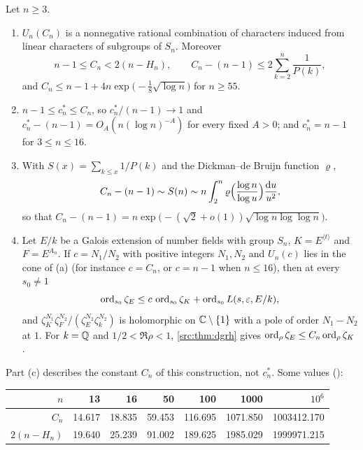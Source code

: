 \begin{theorem}\label{nab:thm:snasym}
Let $n\ge3$.
\begin{enumerate}[label=\textup{(\alph*)}]
\item $U_n(C_n)$ is a nonnegative rational combination of characters induced from linear
characters of subgroups of $S_n$. Moreover
\[
 n-1\le C_n<2(n-H_n),\qquad C_n-(n-1)\le2\sum_{k=2}^n\frac1{P(k)},
\]
and $C_n\le n-1+4n\exp\bigl(-\tfrac18\sqrt{\log n}\bigr)$ for $n\ge55$.
\item $n-1\le c_n^*\le C_n$, so $c_n^*/(n-1)\to1$ and $c_n^*-(n-1)=O_A(n(\log n)^{-A})$ for
every fixed $A>0$; and $c_n^*=n-1$ for $3\le n\le16$.
\item With $S(x)=\sum_{k\le x}1/P(k)$ and the Dickman--de Bruijn function $\varrho$,
\[
 C_n-(n-1)\sim S(n)\sim n\int_2^n\varrho\Bigl(\frac{\log n}{\log u}\Bigr)\frac{\mathrm{d} u}{u^2},
\]
so that $C_n-(n-1)=n\exp\bigl(-(\sqrt2+o(1))\sqrt{\log n\log\log n}\bigr)$.
\item Let $E/k$ be a Galois extension of number fields with group $S_n$, $K=E^{\langle t\rangle}$
and $F=E^{A_n}$. If $c=N_1/N_2$ with positive integers $N_1,N_2$ and $U_n(c)$ lies in the cone of
\textup{(a)} (for instance $c=C_n$, or $c=n-1$ when $n\le16$), then at every $s_0\ne1$
\[
 \operatorname{ord}_{s_0}\zeta_E\le c\,\operatorname{ord}_{s_0}\zeta_K+\operatorname{ord}_{s_0}L(s,\varepsilon,E/k),
\]
and $\zeta_K^{N_1}\zeta_F^{N_2}/(\zeta_E^{N_2}\zeta_k^{N_2})$ is holomorphic on $\mathbb{C}\setminus\{1\}$ with
a pole of order $N_1-N_2$ at $1$. For $k=\mathbb{Q}$ and $1/2<\Re\rho<1$, \cref{src:thm:dgrh} gives
$\operatorname{ord}_\rho\zeta_E\le C_n\operatorname{ord}_\rho\zeta_K$.
\end{enumerate}
\end{theorem}

Part (c) describes the constant $C_n$ of this construction, not $c_n^*$. Some values
():
\begin{center}
\begin{tabular}{rrrrrrr}\toprule
$n$&13&16&50&100&1000&$10^6$\\\midrule
$C_n$&14.617&18.835&59.453&116.695&1071.850&1003412.170\\
$2(n-H_n)$&19.640&25.239&91.002&189.625&1985.029&1999971.215\\\bottomrule
\end{tabular}
\end{center}

